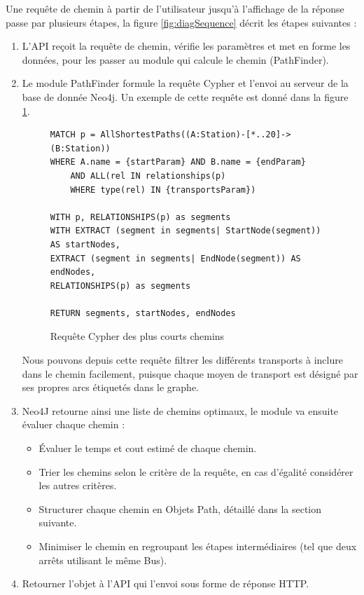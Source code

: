 Une requête de chemin à partir de l'utilisateur jusqu'à l'affichage de la réponse passe par plusieurs étapes, la figure \ref{fig:diagSequence} décrit les étapes suivantes :


\begin{enumerate}
	\item L'API reçoit la requête de chemin, vérifie les paramètres et met en forme les données, pour les passer au module qui calcule le chemin (PathFinder).
	\item Le module PathFinder formule la requête Cypher et l'envoi au serveur de la base de donnée Neo4j.
	      Un exemple de cette requête est donné dans la figure \ref{fig:cipherRequest}.
\begin{figure}[h!]
	      \begin{lstlisting}[style=cypher]
MATCH p = AllShortestPaths((A:Station)-[*..20]->(B:Station))
WHERE A.name = {startParam} AND B.name = {endParam}
	AND ALL(rel IN relationships(p) 
	WHERE type(rel) IN {transportsParam})

WITH p, RELATIONSHIPS(p) as segments
WITH EXTRACT (segment in segments| StartNode(segment)) AS startNodes,
EXTRACT (segment in segments| EndNode(segment)) AS endNodes,
RELATIONSHIPS(p) as segments
            
RETURN segments, startNodes, endNodes
	      \end{lstlisting}
\caption{Requête Cypher des plus courts chemins}
\label{fig:cipherRequest}
\end{figure}
	      Nous pouvons depuis cette requête filtrer les différents transports à inclure dans le chemin facilement, puisque chaque moyen de transport est désigné par ses propres arcs étiquetés dans le graphe.
	\item Neo4J retourne ainsi une liste de chemins optimaux, le module va ensuite évaluer chaque chemin :
	      \begin{itemize}
	      	\item Évaluer le temps et cout estimé de chaque chemin.
	      	\item Trier les chemins selon le critère de la requête, en cas d'égalité considérer les autres critères.
	      	\item Structurer chaque chemin en Objets Path, détaillé dans la section suivante.
	      	\item Minimiser le chemin en regroupant les étapes intermédiaires (tel que deux arrêts utilisant le même Bus).
	      \end{itemize}
	\item Retourner l'objet à l'API qui l'envoi sous forme de réponse HTTP.
\end{enumerate}
\label{SectionPathFinding}
	
